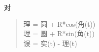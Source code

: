 \documentclass[11pt,a4paper]{article}
\begin{document}
{\cjkfont 对}\allowbreak{}

\begin{quote}\ttfamily\footnotesize {\cjkfont 理}\allowbreak{} = {\cjkfont 圆}\allowbreak{} + R*cos({\cjkfont 角}\allowbreak{}(t))\\{\cjkfont 理}\allowbreak{} = {\cjkfont 圆}\allowbreak{} + R*sin({\cjkfont 角}\allowbreak{}(t))\\{\cjkfont 误}\allowbreak{}         = {\cjkfont 实}\allowbreak{}(t) - {\cjkfont 理}\allowbreak{}(t)\end{quote}
\end{document}
